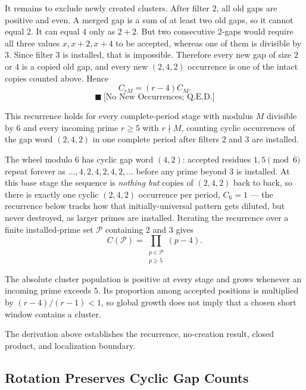 It remains to exclude newly created clusters. After filter $2$, all old
gaps are positive and even. A merged gap is a sum of at least two old
gaps, so it cannot equal $2$. It can equal $4$ only as $2+2$. But two
consecutive 2-gaps would require all three values $x,x+2,x+4$ to be
accepted, whereas one of them is divisible by $3$. Since filter $3$ is
installed, that is impossible. Therefore every new gap of size $2$ or
$4$ is a copied old gap, and every new $(2,4,2)$ occurrence is one of the
intact copies counted above. Hence
\begin{equation*}
C_{rM}=(r-4)C_M.
\end{equation*}
\begin{equation*}
\blacksquare\ \text{[No New Occurrences; Q.E.D.]}
\end{equation*}

This recurrence holds for every complete-period stage with modulus $M$
divisible by $6$ and every incoming prime $r\ge5$ with $r\nmid M$,
counting cyclic occurrences of the gap word $(2,4,2)$ in one complete
period after filters $2$ and $3$ are installed.

The wheel modulo $6$ has cyclic gap word $(4,2)$: accepted residues
$1,5\pmod6$ repeat forever as $\ldots,4,2,4,2,4,2,\ldots$ before any
prime beyond $3$ is installed. At this base stage the sequence is
\emph{nothing but} copies of $(2,4,2)$ back to back, so there is exactly
one cyclic $(2,4,2)$ occurrence per period, $C_6=1$ --- the recurrence
below tracks how that initially-universal pattern gets diluted, but
never destroyed, as larger primes are installed. Iterating the
recurrence over a finite installed-prime set $\mathcal P$ containing $2$
and $3$ gives
\begin{equation*}
C(\mathcal P)
=
\prod_{\substack{p\in\mathcal P\\p\ge5}}(p-4).
\end{equation*}

The absolute cluster population is positive at every stage and grows
whenever an incoming prime exceeds $5$. Its proportion among accepted
positions is multiplied by $(r-4)/(r-1)\lt1$, so global growth does not
imply that a chosen short window contains a cluster.

{\raggedright
The derivation above establishes the recurrence, no-creation result,
closed product, and localization boundary. \par}

\subsection{Rotation Preserves Cyclic Gap Counts}
\label{sec:rotation-preserves-cyclic-gap-counts}

